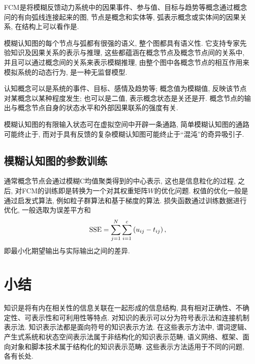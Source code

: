 FCM是将模糊反馈动力系统中的因果事件、参与值、目标与趋势等概念通过概念问的有向弧线连接起来的图, 节点是概念和实体等, 弧表示概念或实体间的因果关系, 在结构上可以看作是.
\begin{remark}
    模糊认知图的每个节点与弧都有很强的语义, 整个图都具有语义性. 它支持专家先验知识及因果关系的表示与推理, 这些都蕴涵在概念节点及概念节点间的关系中, 并且可以通过概念间的关系来表示模糊推理, 由整个图中各概念节点的相互作用来模拟系统的动态行为, 是一种无监督模型.
\end{remark}
\begin{remark}
    认知概念可以是系统的事件、目标、感情及趋势等; 概念值为模糊值, 反映该节点对某概念以某种程度发生; 也可以是二值, 表示概念状态是关还是开. 概念节点的输出与概念节点自身的状态水平和外部因果联系的强度有关.
\end{remark}
\begin{remark}
    模糊认知图的有限输入状态可在虚拟空间中开辟一条通路, 简单模糊认知图的通路可能终止于, 而对于具有反馈的复杂模糊认知图可能终止于“混沌”的奇异吸引子.
\end{remark}

\subsection{模糊认知图的参数训练}

    通常概念节点会通过模糊C均值聚类得到的中心表示, 这也是信息粒化的过程, 之后, 对FCM的训练即是转换为一个对其权重矩阵$W$的优化问题.
    权值的优化一般是通过启发式算法, 例如粒子群算法和基于梯度的算法.
    损失函数通过训练数据进行优化, 一般选取为误差平方和
\begin{align}
    \textup{SSE}=\sum_{j=1}^{N} \sum_{i=1}^{c}\left(u_{i j}-t_{i j}\right),
\end{align}
即最小化期望输出与实际输出之间的差异.
\section{小结}
    知识是将有内在相关性的信息关联在一起形成的信息结构, 具有相对正确性、不确定性、可表示性和可利用性等特点.
    对知识的表示可以分为符号表示法和连接机制表示法. 知识表示法都是面向符号的知识表示方法.
    在这些表示方法中, 谓词逻辑、产生式系统和状态空间表示法属于非结构化的知识表示范畴, 语义网络、框架、面向对象和脚本技术属于结构化的知识表示范畴.
    这些表示方法适用于不同的问题, 各有长处.
